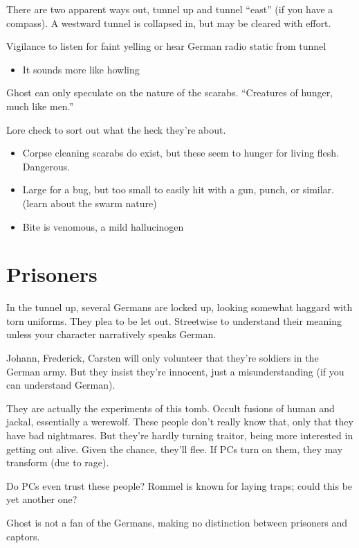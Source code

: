 \documentclass{book}
\newcommand{\df}{\DifficultyDie }
\begin{document}
\begin{multicols}{2}
There are two apparent ways out, tunnel up and tunnel ``east'' (if you have a compass).  A westward tunnel is collapsed in, but may be cleared with effort.

\df\df Vigilance to listen for faint yelling or hear German radio static from tunnel
\begin{itemize}
    \item \Advantage It sounds more like howling
\end{itemize}

Ghost can only speculate on the nature of the scarabs.  ``Creatures of hunger, much like men.''

\df\df Lore check to sort out what the heck they're about.
    \begin{itemize}
        \item \Success Corpse cleaning scarabs do exist, but these seem to hunger for living flesh.  Dangerous.
        \item \Advantage Large for a bug, but too small to easily hit with a gun, punch, or similar.  (learn about the swarm nature)
        \item \Advantage Bite is venomous, a mild hallucinogen
    \end{itemize}

\section{Prisoners}

In the tunnel up, several Germans are locked up, looking somewhat haggard with torn uniforms.  They plea to be let out.  \df\df Streetwise to understand their meaning unless your character narratively speaks German.

Johann, Frederick, Carsten will only volunteer that they're soldiers in the German army.  But they insist they're innocent, just a misunderstanding (if you can understand German).

They are actually the experiments of this tomb.  Occult fusions of human and jackal, essentially a werewolf.  These people don't really know that, only that they have bad nightmares.  But they're hardly turning traitor, being more interested in getting out alive.  Given the chance, they'll flee.  If PCs turn on them, they may transform (due to rage).

Do PCs even trust these people?  Rommel is known for laying traps; could this be yet another one?

Ghost is not a fan of the Germans, making no distinction between prisoners and captors.


\end{multicols}
\end{document}
